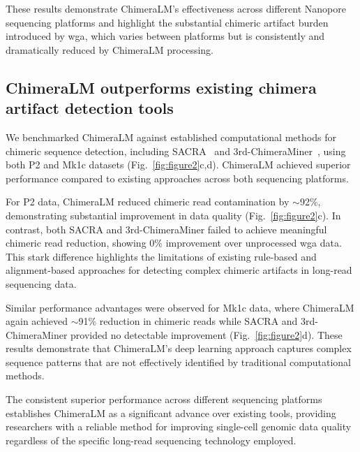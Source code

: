\documentclass[pdflatex,sn-nature]{sn-jnl}%
\theoremstyle{thmstyleone}%
\theoremstyle{thmstyletwo}%
\theoremstyle{thmstylethree}%
\begin{document}
These results demonstrate ChimeraLM's effectiveness across different Nanopore sequencing platforms and highlight the substantial chimeric artifact burden introduced by \gls{wga}, which varies between platforms but is consistently and dramatically reduced by ChimeraLM processing.

\subsection*{ChimeraLM outperforms existing chimera artifact detection tools}

We benchmarked ChimeraLM against established computational methods for chimeric sequence detection, including SACRA~\cite{kiguchi2021long} and 3rd-ChimeraMiner~\cite{lu2023exploration}, using both P2 and Mk1c datasets (Fig.~\ref{fig:figure2}c,d).
ChimeraLM achieved superior performance compared to existing approaches across both sequencing platforms.

For P2 data, ChimeraLM reduced chimeric read contamination by $\sim$92\%, demonstrating substantial improvement in data quality (Fig.~\ref{fig:figure2}c).
In contrast, both SACRA and 3rd-ChimeraMiner failed to achieve meaningful chimeric read reduction, showing 0\% improvement over unprocessed \gls{wga} data.
This stark difference highlights the limitations of existing rule-based and alignment-based approaches for detecting complex chimeric artifacts in long-read sequencing data.

Similar performance advantages were observed for Mk1c data, where ChimeraLM again achieved $\sim$91\% reduction in chimeric reads while SACRA and 3rd-ChimeraMiner provided no detectable improvement (Fig.~\ref{fig:figure2}d).
These results demonstrate that ChimeraLM's deep learning approach captures complex sequence patterns that are not effectively identified by traditional computational methods.

The consistent superior performance across different sequencing platforms establishes ChimeraLM as a significant advance over existing tools, providing researchers with a reliable method for improving single-cell genomic data quality regardless of the specific long-read sequencing technology employed.
\end{document}
